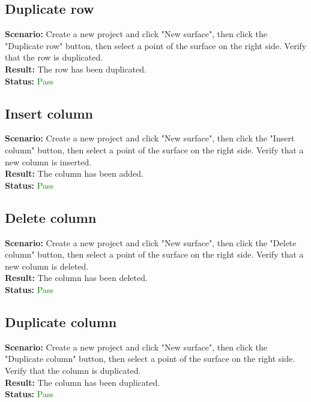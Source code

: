 \documentclass[a4paper, 11pt, article]{report}
\begin{document}
\subsection{Duplicate row}

\noindent \textbf{Scenario:} Create a new project and click "New surface", then click the "Duplicate row" button, then select a point of the surface on the right side. Verify that the row is duplicated.
\\
\noindent \textbf{Result:} The row has been duplicated.
\\
\noindent \textbf{Status:} \textcolor{green}{Pass}

\subsection{Insert column}

\noindent \textbf{Scenario:} Create a new project and click "New surface", then click the "Insert column" button, then select a point of the surface on the right side. Verify that a new column is inserted.
\\
\noindent \textbf{Result:} The column has been added.
\\
\noindent \textbf{Status:} \textcolor{green}{Pass}

\subsection{Delete column}

\noindent \textbf{Scenario:} Create a new project and click "New surface", then click the "Delete column" button, then select a point of the surface on the right side. Verify that a new column is deleted.
\\
\noindent \textbf{Result:} The column has been deleted.
\\
\noindent \textbf{Status:} \textcolor{green}{Pass}

\subsection{Duplicate column}

\noindent \textbf{Scenario:} Create a new project and click "New surface", then click the "Duplicate column" button, then select a point of the surface on the right side. Verify that the column is duplicated.
\\
\noindent \textbf{Result:} The column has been duplicated.
\\
\noindent \textbf{Status:} \textcolor{green}{Pass}
\end{document}
